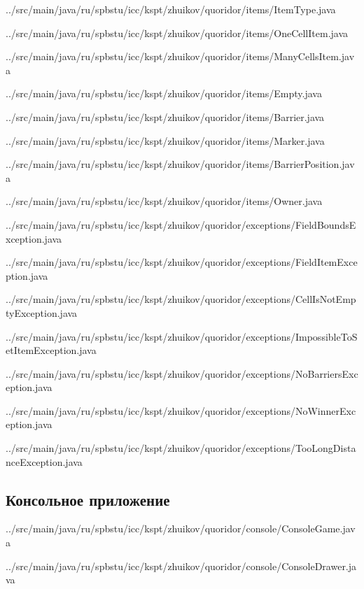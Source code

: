 \documentclass[a4paper]{article}
\begin{document}

{../src/main/java/ru/spbstu/icc/kspt/zhuikov/quoridor/items/ItemType.java}


{../src/main/java/ru/spbstu/icc/kspt/zhuikov/quoridor/items/OneCellItem.java}


{../src/main/java/ru/spbstu/icc/kspt/zhuikov/quoridor/items/ManyCellsItem.java}


{../src/main/java/ru/spbstu/icc/kspt/zhuikov/quoridor/items/Empty.java}


{../src/main/java/ru/spbstu/icc/kspt/zhuikov/quoridor/items/Barrier.java}


{../src/main/java/ru/spbstu/icc/kspt/zhuikov/quoridor/items/Marker.java}


{../src/main/java/ru/spbstu/icc/kspt/zhuikov/quoridor/items/BarrierPosition.java}


{../src/main/java/ru/spbstu/icc/kspt/zhuikov/quoridor/items/Owner.java}
\newpage


{../src/main/java/ru/spbstu/icc/kspt/zhuikov/quoridor/exceptions/FieldBoundsException.java}


{../src/main/java/ru/spbstu/icc/kspt/zhuikov/quoridor/exceptions/FieldItemException.java}


{../src/main/java/ru/spbstu/icc/kspt/zhuikov/quoridor/exceptions/CellIsNotEmptyException.java}


{../src/main/java/ru/spbstu/icc/kspt/zhuikov/quoridor/exceptions/ImpossibleToSetItemException.java}


{../src/main/java/ru/spbstu/icc/kspt/zhuikov/quoridor/exceptions/NoBarriersException.java}


{../src/main/java/ru/spbstu/icc/kspt/zhuikov/quoridor/exceptions/NoWinnerException.java}


{../src/main/java/ru/spbstu/icc/kspt/zhuikov/quoridor/exceptions/TooLongDistanceException.java}

\subsection{Консольное приложение}


{../src/main/java/ru/spbstu/icc/kspt/zhuikov/quoridor/console/ConsoleGame.java}
\newpage


{../src/main/java/ru/spbstu/icc/kspt/zhuikov/quoridor/console/ConsoleDrawer.java}
\newpage
\end{document}
